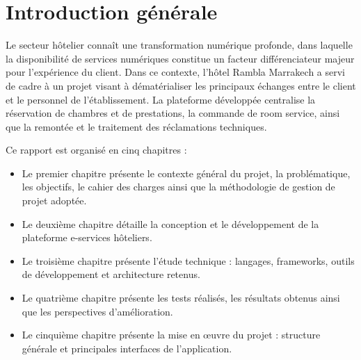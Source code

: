 \documentclass[12pt,a4paper]{report}
\begin{document}
\clearpage

\listoffigures
{}
\clearpage

\listoftables
{}
\clearpage

\tableofcontents
\clearpage

\setcounter{page}{1}

\chapter*{Introduction générale}

Le secteur hôtelier connaît une transformation numérique profonde, dans
laquelle la disponibilité de services numériques constitue un facteur
différenciateur majeur pour l'expérience du client. Dans ce contexte,
l'hôtel Rambla Marrakech a servi de cadre à un projet visant à
dématérialiser les principaux échanges entre le client et le personnel de
l'établissement. La plateforme développée centralise la réservation de
chambres et de prestations, la commande de room service, ainsi que la
remontée et le traitement des réclamations techniques.

Ce rapport est organisé en cinq chapitres :

\begin{itemize}
    \item Le premier chapitre présente le contexte général du projet, la
    problématique, les objectifs, le cahier des charges ainsi que la
    méthodologie de gestion de projet adoptée.
    \item Le deuxième chapitre détaille la conception et le développement
    de la plateforme e-services hôteliers.
    \item Le troisième chapitre présente l'étude technique : langages,
    frameworks, outils de développement et architecture retenus.
    \item Le quatrième chapitre présente les tests réalisés, les résultats
    obtenus ainsi que les perspectives d'amélioration.
    \item Le cinquième chapitre présente la mise en \oe uvre du projet :
    structure générale et principales interfaces de l'application.
\end{itemize}
\end{document}
